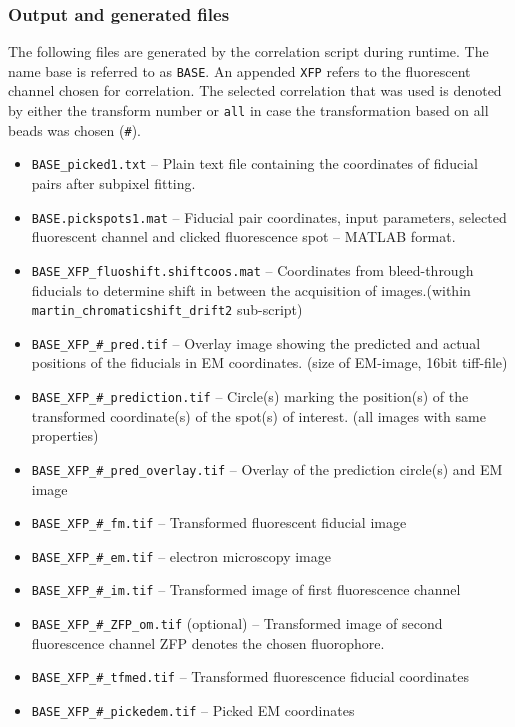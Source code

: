 \documentclass[10pt,a4paper,onepage,DIV12]{scrartcl}
\begin{document}
\subsubsection{Output and generated files}
\label{sec:lm_output}
The following files are generated by the correlation script during runtime. The name base is referred to as \texttt{BASE}. An appended \texttt{XFP} refers to the fluorescent channel chosen for correlation. The selected correlation that was used is denoted by either the transform number or \texttt{all} in case the transformation based on all beads was chosen (\texttt{\#}). 
\begin{itemize}
 \item \texttt{BASE\_picked1.txt} -- Plain text file containing the coordinates of fiducial pairs after subpixel fitting. 

\item \texttt{BASE.pickspots1.mat} -- Fiducial pair coordinates, input parameters, selected fluorescent channel and clicked fluorescence spot -- MATLAB format.

 \item \texttt{BASE\_XFP\_fluoshift.shiftcoos.mat} -- Coordinates from bleed-through fiducials to determine shift in between the acquisition of images.(within \texttt{martin\_chromaticshift\_drift2} sub-script)



\item \texttt{BASE\_XFP\_\#\_pred.tif} -- Overlay image showing the predicted and actual positions of the fiducials in EM coordinates. (size of EM-image, 16bit tiff-file)
\item \texttt{BASE\_XFP\_\#\_prediction.tif} -- Circle(s) marking the position(s) of the transformed coordinate(s) of the spot(s) of interest. (all images with same properties)
\item \texttt{BASE\_XFP\_\#\_pred\_overlay.tif} -- Overlay of the prediction circle(s) and EM image
\item \texttt{BASE\_XFP\_\#\_fm.tif} -- Transformed fluorescent fiducial image 
\item \texttt{BASE\_XFP\_\#\_em.tif} -- electron microscopy image 
\item \texttt{BASE\_XFP\_\#\_im.tif} -- Transformed image of first fluorescence channel
\item \texttt{BASE\_XFP\_\#\_ZFP\_om.tif} (optional) -- Transformed image of second fluorescence channel ZFP denotes the chosen fluorophore.
\item \texttt{BASE\_XFP\_\#\_tfmed.tif} -- Transformed fluorescence fiducial coordinates
\item \texttt{BASE\_XFP\_\#\_pickedem.tif} -- Picked EM coordinates


\end{itemize}
\end{document}
